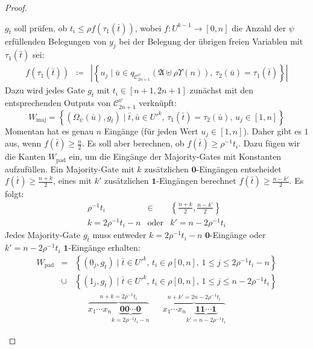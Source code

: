 \begin{proof}
\begin{casenv}
$g_{\bar{t}}$ soll prüfen, ob $t_{i}\leqslant\rho f\left(\tau_{1}\left(\bar{t}\right)\right)$,
wobei $f:U^{k-1}\rightarrow\left[0,n\right]$ die Anzahl der $\psi$
erfüllenden Belegungen von $y_{j}$ bei der Belegung der übrigen freien
Variablen mit $\tau_{1}\left(\bar{t}\right)$ sei: 
\begin{eqnarray*}
f\left(\tau_{1}\left(\bar{t}\right)\right) & \coloneqq & \left|\left\{ u_{j}\mid\bar{u}\in q_{\mathcal{C}_{2n+1}^{\psi}}\left(\mathfrak{A}\uplus\rho\Upsilon\left(n\right)\right),\,\tau_{2}\left(\bar{u}\right)=\tau_{1}\left(\bar{t}\right)\right\} \right|
\end{eqnarray*}
Dazu wird jedes Gate $g_{\bar{t}}$ mit $t_{i}\in\left[n+1,2n+1\right]$
zunächst mit den entsprechenden Outputs von $\mathcal{C}_{2n+1}^{\psi}$
verknüpft: 
\[
W_{\mathrm{maj}}=\left\{ \left(\Omega_{\psi}\left(\bar{u}\right),g_{\bar{t}}\right)\mid\bar{t},\bar{u}\in U'^{k},\,\tau_{1}\left(\bar{t}\right)=\tau_{2}\left(\bar{u}\right),\,u_{j}\in\left[1,n\right]\right\} 
\]
Momentan hat es genau $n$ Eingänge (für jeden Wert $u_{j}\in\left[1,n\right]$).
Daher gibt es $1$ aus, wenn $f\left(\bar{t}\right)\geqslant\frac{n}{2}$.
Es soll aber berechnen, ob $f\left(\bar{t}\right)\geqslant\rho^{-1}t_{i}$.
Dazu fügen wir die Kanten $W_{\mathrm{pad}}$ ein, um die Eingänge
der Majority-Gates mit Konstanten aufzufüllen. Ein Majority-Gate mit
$k$ zusätzlichen $\mathbf{0}$-Eingängen entscheidet $f\left(\bar{t}\right)\geqslant\frac{n+k}{2}$,
eines mit $k'$ zusätzlichen $\mathbf{1}$-Eingängen berechnet $f\left(\bar{t}\right)\geqslant\frac{n-k'}{2}$.
Es folgt:
\begin{eqnarray*}
\rho^{-1}t_{i} & \in & \left\{ \frac{n+k}{2},\frac{n-k'}{2}\right\} \\
k=2\rho^{-1}t_{i}-n & \mbox{oder} & k'=n-2\rho^{-1}t_{i}
\end{eqnarray*}
Jedes Majority-Gate $g_{\bar{t}}$ muss entweder $k=2\rho^{-1}t_{i}-n$
$\mathbf{0}$-Eingänge oder $k'=n-2\rho^{-1}t_{i}$ $\mathbf{1}$-Eingänge
erhalten:
\begin{eqnarray*}
W_{\mathrm{pad}} & = & \left\{ \left(0_{j},g_{\bar{t}}\right)\mid\bar{t}\in U'^{k},\,t_{i}\in\rho\left[0,n\right],\,1\leqslant j\leqslant2\rho^{-1}t_{i}-n\right\} \\
 & \cup & \left\{ \left(1_{j},g_{\bar{t}}\right)\mid\bar{t}\in U'^{k},\,t_{i}\in\rho\left[0,n\right],\,1\leqslant j\leqslant n-2\rho^{-1}t_{i}\right\} 
\end{eqnarray*}
\begin{eqnarray*}
\overset{n+k=2\rho^{-1}t_{i}}{\overbrace{x_{1}\cdots x_{n}\underset{k=2\rho^{-1}t_{i}-n}{\underbrace{\mathbf{0}\mathbf{0}\cdots\mathbf{0}}}}} &  & \overset{n+k'=2n-2\rho^{-1}t_{i}}{\overbrace{x_{1}\cdots x_{n}\underset{k'=n-2\rho^{-1}t_{i}}{\underbrace{\mathbf{1}\mathbf{1}\cdots\mathbf{1}}}}}

\end{eqnarray*}
\end{casenv}
\end{proof}
